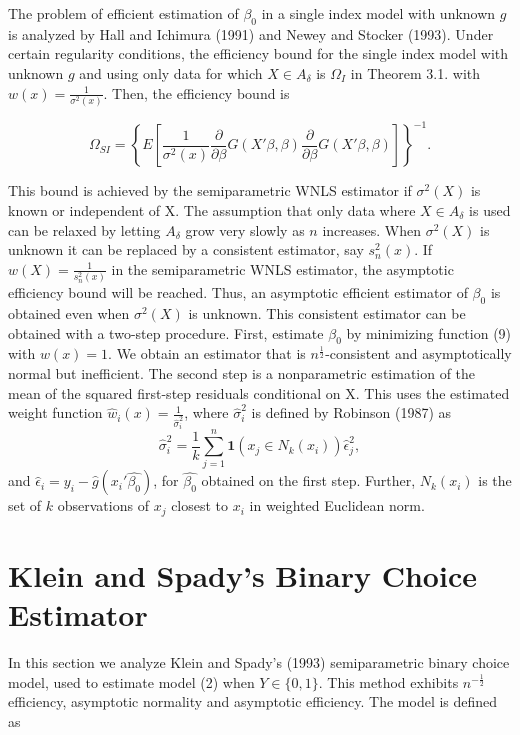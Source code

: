 \documentclass[a4paper]{article}
\begin{document}
The problem of efficient estimation of $\beta_0$ in a single index model with unknown $g$ is analyzed by Hall and Ichimura (1991) and Newey and Stocker (1993). Under certain regularity conditions, the efficiency bound for the single index model with unknown $g$ and using only data for which $X \in A_{\delta}$ is $\Omega_I$ in Theorem 3.1. with $w(x) = \frac{1}{\sigma^2(x)}$. Then, the efficiency bound is

\begin{equation}
\Omega_{SI} = \left\{ E\left[\frac{1}{\sigma^2(x)}\frac{\partial}{\partial \beta}
 G(X'\beta,\beta)\frac{\partial}{\partial \beta} G(X'\beta,\beta) \right] \right\}^{-1}.
\end{equation}


This bound is achieved by the semiparametric WNLS estimator if $\sigma^2(X)$ is known or independent of X. The assumption that only data where  $X \in A_{\delta}$ is used can be relaxed by letting $A_\delta$ grow very slowly as $n$ increases. When $\sigma^2(X)$ is unknown it can be replaced by a consistent estimator, say $s_{n}^{2}(x)$. If $w(X) = \frac{1}{s_{n}^{2}(x)}$ in the semiparametric WNLS estimator, the asymptotic efficiency bound will be reached. Thus, an asymptotic efficient estimator of $\beta_0$ is obtained even when $\sigma^2(X)$ is unknown. This consistent estimator can be obtained with a two-step procedure. First, estimate $\beta_0$ by minimizing function (9) with $w(x) = 1$. We obtain an estimator that is $n^{\frac{1}{2}}$-consistent and asymptotically normal but inefficient. The second step is a nonparametric estimation of the mean of the squared first-step residuals conditional on X. This uses the estimated weight function $\hat{w}_i(x) = \frac{1}{\hat{\sigma}_{i}^{2}}$, where  $\hat{\sigma}_{i}^{2}$ is defined by Robinson (1987) as 
\[\hat{\sigma}_{i}^{2} = \frac{1}{k}\sum_{j=1}^{n} \mathbf{1}{(x_j \in N_k(x_i))}\hat{\epsilon}_{j}^{2} ,\]
and $\hat{\epsilon}_i = y_i - \hat{g}(x_i'\hat{\beta_0})$, for $\hat{\beta_0}$ obtained on the first step. Further, $N_k(x_i)$ is the set of $k$ observations of $x_j$ closest to $x_i$ in weighted Euclidean norm.


\section{Klein and Spady's Binary Choice Estimator} %
\label{sec:section_about_references_within_the_document}
In this section we analyze Klein and Spady's (1993) semiparametric binary choice model, used to estimate model (2) when $Y \in \{0,1\}$.   This method exhibits $n^{-\frac{1}{2}}$ efficiency, asymptotic normality and asymptotic efficiency. The model is defined as
\end{document}
